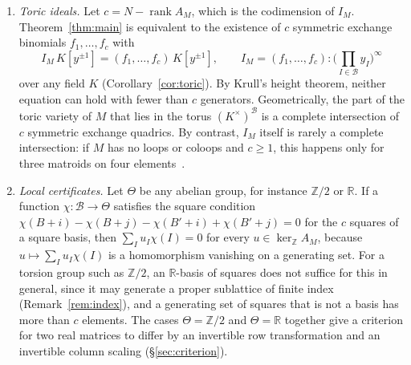 \documentclass[11pt,a4paper]{article}
\theoremstyle{plain}
\theoremstyle{definition}
\newcommand{\R}{\mathbb R}
\newcommand{\Z}{\mathbb Z}
\newcommand{\AM}{A_M}
\newcommand{\kerZ}{\ker_{\Z}\!A_M}
\newcommand{\bs}{\mathcal B}
\newcommand{\rank}{\operatorname{rank}}
\begin{document}
\begin{enumerate}[label=(\roman*),leftmargin=2em,itemsep=2pt]
\item \emph{Toric ideals.} Let $c=N-\rank\AM$, which is the codimension of $I_M$. Theorem~\ref{thm:main} is equivalent to the existence of $c$ symmetric exchange binomials $f_1,\dots,f_c$ with
\[
I_M\,K[y^{\pm1}]=(f_1,\dots,f_c)\,K[y^{\pm1}],\qquad I_M=(f_1,\dots,f_c):\Big(\prod_{I\in\bs}y_I\Big)^{\infty}
\]
over any field $K$ (Corollary~\ref{cor:toric}). By Krull's height theorem, neither equation can hold with fewer than $c$ generators. Geometrically, the part of the toric variety of $M$ that lies in the torus $(K^\times)^{\bs}$ is a complete intersection of $c$ symmetric exchange quadrics. By contrast, $I_M$ itself is rarely a complete intersection: if $M$ has no loops or coloops and $c\ge1$, this happens only for three matroids on four elements~\cite{GR15}.
\item \emph{Local certificates.} Let $\Theta$ be any abelian group, for instance $\Z/2$ or $\R$. If a function $\chi:\bs\to\Theta$ satisfies the square condition $\chi(B+i)-\chi(B+j)-\chi(B'+i)+\chi(B'+j)=0$ for the $c$ squares of a square basis, then $\sum_I u_I\chi(I)=0$ for every $u\in\kerZ$, because $u\mapsto\sum_Iu_I\chi(I)$ is a homomorphism vanishing on a generating set. For a torsion group such as $\Z/2$, an $\R$-basis of squares does not suffice for this in general, since it may generate a proper sublattice of finite index (Remark~\ref{rem:index}), and a generating set of squares that is not a basis has more than $c$ elements. The cases $\Theta=\Z/2$ and $\Theta=\R$ together give a criterion for two real matrices to differ by an invertible row transformation and an invertible column scaling (\S\ref{sec:criterion}).
\end{enumerate}
\end{document}
